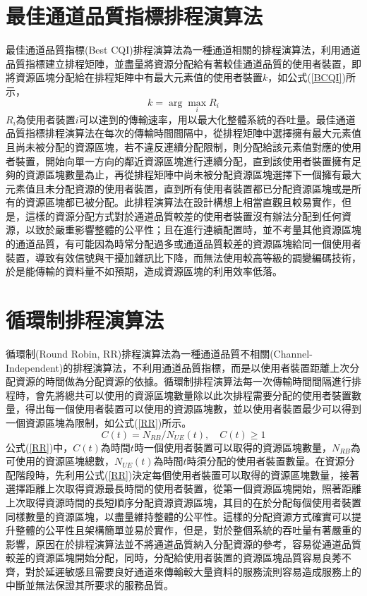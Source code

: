 \section{最佳通道品質指標排程演算法}
最佳通道品質指標(Best CQI)排程演算法\cite{su2016}為一種通道相關的排程演算法，利用通道品質指標建立排程矩陣，並盡量將資源分配給有著較佳通道品質的使用者裝置，即將資源區塊分配給在排程矩陣中有最大元素值的使用者裝置$k$，如公式(\ref{BCQI})所示，
\begin{equation}
\label{BCQI}
k=\arg\max_{i}R_i
\end{equation}
$R_i$為使用者裝置$i$可以達到的傳輸速率，用以最大化整體系統的吞吐量。最佳通道品質指標排程演算法在每次的傳輸時間間隔中，從排程矩陣中選擇擁有最大元素值且尚未被分配的資源區塊，若不違反連續分配限制，則分配給該元素值對應的使用者裝置，開始向單一方向的鄰近資源區塊進行連續分配，直到該使用者裝置擁有足夠的資源區塊數量為止，再從排程矩陣中尚未被分配資源區塊選擇下一個擁有最大元素值且未分配資源的使用者裝置，直到所有使用者裝置都已分配資源區塊或是所有的資源區塊都已被分配。此排程演算法在設計構想上相當直觀且較易實作，但是，這樣的資源分配方式對於通道品質較差的使用者裝置沒有辦法分配到任何資源，以致於嚴重影響整體的公平性；且在進行連續配置時，並不考量其他資源區塊的通道品質，有可能因為時常分配過多或通道品質較差的資源區塊給同一個使用者裝置，導致有效信號與干擾加雜訊比下降，而無法使用較高等級的調變編碼技術，於是能傳輸的資料量不如預期，造成資源區塊的利用效率低落。

\section{循環制排程演算法}
循環制(Round Robin, RR)排程演算法\cite{arsh2015}為一種通道品質不相關(Channel-Independent)的排程演算法，不利用通道品質指標，而是以使用者裝置距離上次分配資源的時間做為分配資源的依據。循環制排程演算法每一次傳輸時間間隔進行排程時，會先將總共可以使用的資源區塊數量除以此次排程需要分配的使用者裝置數量，得出每一個使用者裝置可以使用的資源區塊數，並以使用者裝置最少可以得到一個資源區塊為限制，如公式(\ref{RR})所示。
\begin{equation}
\label{RR}
C(t)=N_{RB}/N_{UE}(t),\quad C(t)\geq 1
\end{equation}
公式(\ref{RR})中，$C(t)$為時間$t$時一個使用者裝置可以取得的資源區塊數量，$N_{RB}$為可使用的資源區塊總數，$N_{UE}(t)$為時間$t$時須分配的使用者裝置數量。在資源分配階段時，先利用公式(\ref{RR})決定每個使用者裝置可以取得的資源區塊數量，接著選擇距離上次取得資源最長時間的使用者裝置，從第一個資源區塊開始，照著距離上次取得資源時間的長短順序分配資源資源區塊，其目的在於分配每個使用者裝置同樣數量的資源區塊，以盡量維持整體的公平性。這樣的分配資源方式確實可以提升整體的公平性且架構簡單並易於實作，但是，對於整個系統的吞吐量有著嚴重的影響，原因在於排程演算法並不將通道品質納入分配資源的參考，容易從通道品質較差的資源區塊開始分配，同時，分配給使用者裝置的資源區塊品質容易良莠不齊，對於延遲敏感且需要良好通道來傳輸較大量資料的服務流則容易造成服務上的中斷並無法保證其所要求的服務品質。
\clearpage
